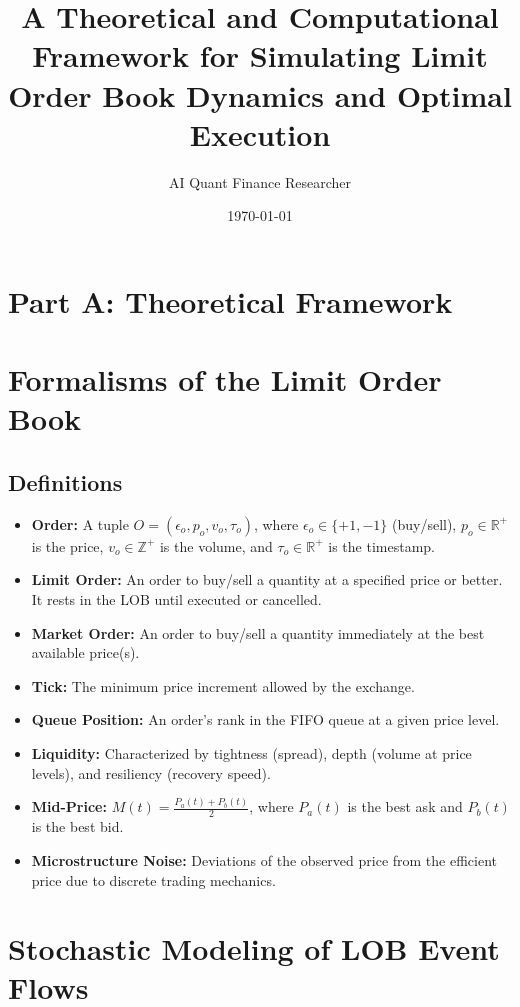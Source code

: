 \documentclass{article}
\title{A Theoretical and Computational Framework for Simulating Limit Order Book Dynamics and Optimal Execution}
\author{AI Quant Finance Researcher}
\date{\today}
\begin{document}
\maketitle

\section*{Part A: Theoretical Framework}

\section{Formalisms of the Limit Order Book}

\subsection{Definitions}

\begin{itemize}
    \item \textbf{Order:} A tuple $O = (\epsilon_o, p_o, v_o, \tau_o)$, where $\epsilon_o \in \{+1, -1\}$ (buy/sell), $p_o \in \mathbb{R}^+$ is the price, $v_o \in \mathbb{Z}^+$ is the volume, and $\tau_o \in \mathbb{R}^+$ is the timestamp.
    \item \textbf{Limit Order:} An order to buy/sell a quantity at a specified price or better.  It rests in the LOB until executed or cancelled.
    \item \textbf{Market Order:} An order to buy/sell a quantity immediately at the best available price(s).
    \item \textbf{Tick:} The minimum price increment allowed by the exchange.
    \item \textbf{Queue Position:} An order's rank in the FIFO queue at a given price level.
    \item \textbf{Liquidity:}  Characterized by tightness (spread), depth (volume at price levels), and resiliency (recovery speed).
    \item \textbf{Mid-Price:} $M(t) = \frac{P_a(t) + P_b(t)}{2}$, where $P_a(t)$ is the best ask and $P_b(t)$ is the best bid.
    \item \textbf{Microstructure Noise:}  Deviations of the observed price from the efficient price due to discrete trading mechanics.
\end{itemize}


\section{Stochastic Modeling of LOB Event Flows}
\end{document}
